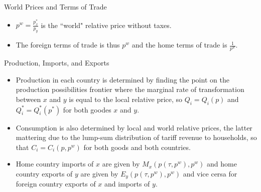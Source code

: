 \documentclass[aspectratio=169]{beamer}
\begin{document}

\begin{frame}{World Prices and Terms of Trade}

\begin{itemize}
    \item<1-> $ p^{w} = \frac{p_{x}^{*}}{p_{y}} $ is the ``world" relative price without taxes.
    \item<2-> The foreign terms of trade is thus $ p^{w} $ and the home terms of trade is $ \frac{1}{p^{w}} $. 
\end{itemize}
    
\end{frame}


\begin{frame}{Production, Imports, and Exports}

\begin{itemize}
    \item<1-> Production in each country is determined by finding the point on the production possibilities frontier where the marginal rate of transformation between $ x $ and $ y $ is equal to the local relative price, so $ Q_{i} = Q_{i}\left( p \right) $ and $ Q_{i}^{*} = Q_{i}^{*}\left( p^{*} \right) $ for both goodes $ x $ and $ y $.
    \item<2-> Consumption is also determined by local and world relative prices, the latter mattering due to the lump-sum distribution of tariff revenue to households, so that $ C_{i} = C_{i}\left( p, p^{w} \right) $ for both goods and both countries.
    \item<3-> Home country imports of $ x $ are given by $ M_{x}\left( p\left( \tau, p^{w} \right), p^{w} \right) $ and home country exports of $ y $ are given by $ E_{y}\left( p\left( \tau, p^{w} \right), p^{w} \right) $ and vice cersa for foreign country exports of $ x $ and imports of $ y $.
\end{itemize}
    
\end{frame}

\end{document}
